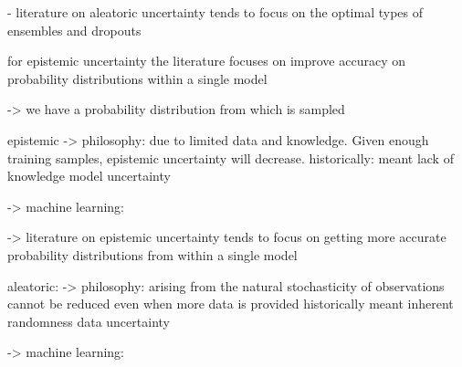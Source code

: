 - literature on aleatoric uncertainty tends to focus on the optimal types of ensembles and dropouts \cite{human-in-the-loop}


for epistemic uncertainty the literature focuses
on improve accuracy on probability distributions within a single model \cite{human-in-the-loop}

-> we have a probability distribution from which is sampled



epistemic
-> philosophy: 
due to limited data and knowledge. 
Given enough training samples, epistemic uncertainty will decrease.
historically: meant lack of knowledge
model uncertainty

-> machine learning:

-> literature on epistemic uncertainty tends to focus
on getting more accurate probability distributions from within a single model



aleatoric:
-> philosophy:
arising from the natural stochasticity of observations
cannot be reduced even when more data is provided
historically meant inherent randomness
data uncertainty

-> machine learning: